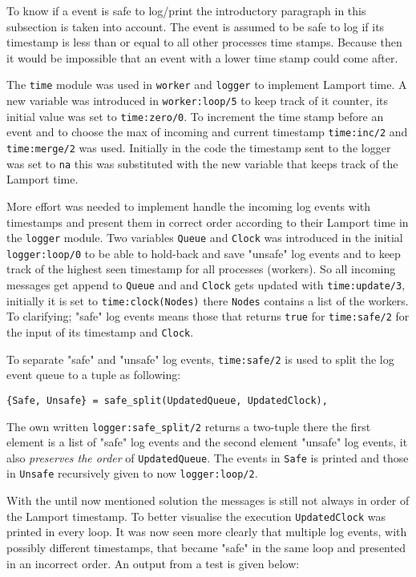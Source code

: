 \documentclass[a4paper, 11pt]{article}
\begin{document}
To know if a event is safe to log/print the introductory paragraph in this subsection is taken into account. The event is assumed to be safe to log if its timestamp is less than or equal to all other processes time stamps. Because then it would be impossible that an event with a lower time stamp could come after.

The \verb!time! module was used in \verb!worker! and \verb!logger! to implement Lamport time. A new variable was introduced in \verb!worker:loop/5! to keep track of it counter, its initial value was set to \verb!time:zero/0!. To increment the time stamp before an event and to choose the max of incoming and current timestamp \verb!time:inc/2! and \verb!time:merge/2! was used. Initially in the code the timestamp sent to the logger was set to \verb!na! this was substituted with the new variable that keeps track of the Lamport time.

More effort was needed to implement handle the incoming log events with timestamps and present them in correct order according to their Lamport time in the \verb!logger! module. Two variables \verb!Queue! and \verb!Clock! was introduced in the initial \verb!logger:loop/0! to be able to hold-back and save "unsafe" log events and to keep track of the highest seen timestamp for all processes (workers). So all incoming messages get append to \verb!Queue! and and \verb!Clock! gets updated with \verb!time:update/3!, initially it is set to \verb!time:clock(Nodes)! there \verb!Nodes! contains a list of the workers. To clarifying; "safe" log events means those that returns \verb!true! for \verb!time:safe/2! for the input of its timestamp and \verb!Clock!.

To separate "safe" and "unsafe" log events, \verb!time:safe/2! is used to split the log event queue to a tuple as following:

\begin{verbatim}
{Safe, Unsafe} = safe_split(UpdatedQueue, UpdatedClock),
\end{verbatim}

The own written \verb!logger:safe_split/2! returns a two-tuple there the first element is a list of "safe" log events and the second element "unsafe" log events, it also \textit{preserves the order} of \verb!UpdatedQueue!. The events in \verb!Safe! is printed and those in \verb!Unsafe! recursively given to now \verb!logger:loop/2!.

With the until now mentioned solution the messages is still not always in order of the Lamport timestamp. To better visualise the execution \verb!UpdatedClock! was printed in every loop. It was now seen more clearly that multiple log events, with possibly different timestamps, that became "safe" in the same loop and presented in an incorrect order. An output from a test is given below:
\end{document}
